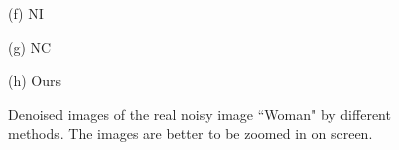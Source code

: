 \documentclass[10pt,onecolumn,letterpaper]{article}
\begin{document}
\begin{figure}[H]
{\begin{minipage}[t]{0.244\textwidth}
{\footnotesize (f) NI \cite{neatimage}  }
\end{minipage}
\begin{minipage}[t]{0.244\textwidth}
\centering
{}
{\footnotesize (g) NC \cite{ncwebsite,noiseclinic}   }
\end{minipage}
\begin{minipage}[t]{0.244\textwidth}
\centering
{}
{\footnotesize (h) Ours  }
\end{minipage}
}
\caption{Denoised images of the real noisy image ``Woman" \cite{ncwebsite} by different methods. The images are better to be zoomed in on screen.}
\label{fig3}
\end{figure}
\end{document}

